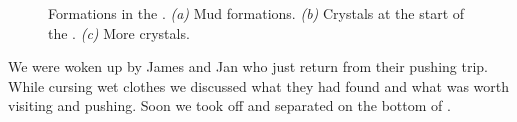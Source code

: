 \begin{figure}[t!]
\begin{subfigure}[t]{0.418\textwidth}
        \caption{} \label{crystal formation}
    \end{subfigure}

    \caption{Formations in the \protect{}.
    \textit{(a)} Mud formations. 
    \textit{(b)} Crystals at the start of the \protect{}. 
    \textit{(c)} More crystals. }
\end{figure}



We were woken up by James and Jan who just return from their pushing trip. While cursing wet clothes we discussed what they had found and what was worth visiting and pushing. Soon we took off and separated on the bottom of .


